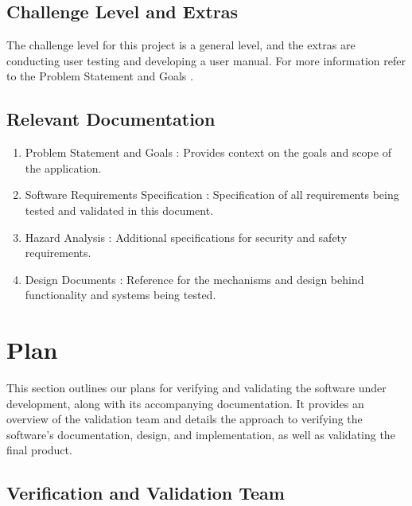 \documentclass[12pt, titlepage]{article}
\begin{document}
\subsection{Challenge Level and Extras}

The challenge level for this project is a general level, and the
extras are conducting user testing and developing a user manual. For
more information refer to the Problem Statement and Goals
\citep[\textit{Challenge Level and Extras}]{ProblemStatement}.

\subsection{Relevant Documentation}

\begin{enumerate}
  \item Problem Statement and Goals \citep{ProblemStatement}:
    Provides context on the goals and scope of the application.
  \item Software Requirements Specification :
    Specification of all requirements being tested and validated in
    this document.
  \item Hazard Analysis : Additional
    specifications for security and safety requirements.
  \item Design Documents : Reference for the
    mechanisms and design behind functionality and systems being tested.
\end{enumerate}

\newpage
\section{Plan}

This section outlines our plans for verifying and validating the
software under development, along with its accompanying
documentation. It provides an overview of the validation team and
details the approach to verifying the software's documentation,
design, and implementation, as well as validating the final product.

\subsection{Verification and Validation Team}
\end{document}
